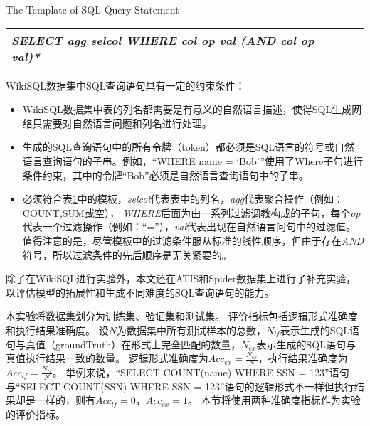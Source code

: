 \begin{table}[!hpb]
  \centering
    {The Template of SQL Query Statement}
  \label{nli:sqlmb}
  \begin{tabular}{@{}llr@{}} \toprule
  \emph{SELECT   agg   selcol   WHERE   col   op   val   (AND   col   op   val)*}\\\bottomrule

  \end{tabular}
\end{table}

WikiSQL数据集中SQL查询语句具有一定的约束条件：

\begin{itemize}
  \item WikiSQL数据集中表的列名都需要是有意义的自然语言描述，使得SQL生成网络只需要对自然语言问题和列名进行处理。
  \item 生成的SQL查询语句中的所有令牌（token）都必须是SQL语言的符号或自然语言查询语句的子串。例如，“WHERE name = ‘Bob’”使用了Where子句进行条件约束，其中的令牌“Bob”必须是自然语言查询语句中的子串。
  \item 必须符合表\ref{nli:sqlmb}中的模板，\emph{selcol}代表表中的列名，\emph{agg}代表聚合操作（例如：COUNT,SUM或空），
      \emph{WHERE}后面为由一系列过滤调教构成的子句，每个\emph{op}代表一个过滤操作（例如：“=”），\emph{val}代表出现在自然语言问句中的过滤值。
      值得注意的是，尽管模板中的过滤条件服从标准的线性顺序，但由于存在\emph{AND}符号，所以过滤条件的先后顺序是无关紧要的。
\end{itemize}

除了在WikiSQL进行实验外，本文还在ATIS\cite{Dahl1994Expanding}和Spider数据集\cite{yu2018spider}上进行了补充实验，以评估模型的拓展性和生成不同难度的SQL查询语句的能力。

本实验将数据集划分为训练集、验证集和测试集。
评价指标包括逻辑形式准确度和执行结果准确度。
设$N$为数据集中所有测试样本的总数，$N_{lf}$表示生成的SQL语句与真值（groundTruth）在形式上完全匹配的数量，$N_{ex}$表示生成的SQL语句与真值执行结果一致的数量。
逻辑形式准确度为$Acc_{ex} = \frac{N_{ex}}{N}$，执行结果准确度为$Acc_{lf} = \frac{N_{lf}}{N}$。
举例来说，“SELECT COUNT(name) WHERE SSN = 123”语句与“SELECT COUNT(SSN) WHERE SSN = 123”语句的逻辑形式不一样但执行结果却是一样的，则有$Acc_{lf} = 0$，$Acc_{ex} = 1$。
本节将使用两种准确度指标作为实验的评价指标。

